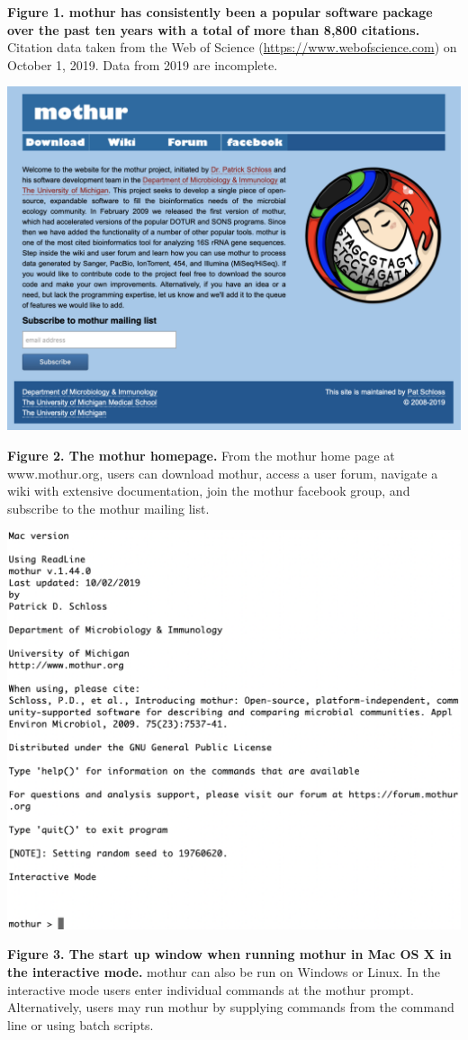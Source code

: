 \documentclass[11pt,]{article}
\begin{document}
\textbf{Figure 1. mothur has consistently been a popular software
package over the past ten years with a total of more than 8,800
citations.} Citation data taken from the Web of Science
(\url{https://www.webofscience.com}) on October 1, 2019. Data from 2019
are incomplete.

\newpage

\includegraphics{figure_2.png}

\textbf{Figure 2. The mothur homepage.} From the mothur home page at
www.mothur.org, users can download mothur, access a user forum, navigate
a wiki with extensive documentation, join the mothur facebook group, and
subscribe to the mothur mailing list.

\newpage

\includegraphics{figure_3.png}

\textbf{Figure 3. The start up window when running mothur in Mac OS X in
the interactive mode.} mothur can also be run on Windows or Linux. In
the interactive mode users enter individual commands at the mothur
prompt. Alternatively, users may run mothur by supplying commands from
the command line or using batch scripts.
\end{document}
